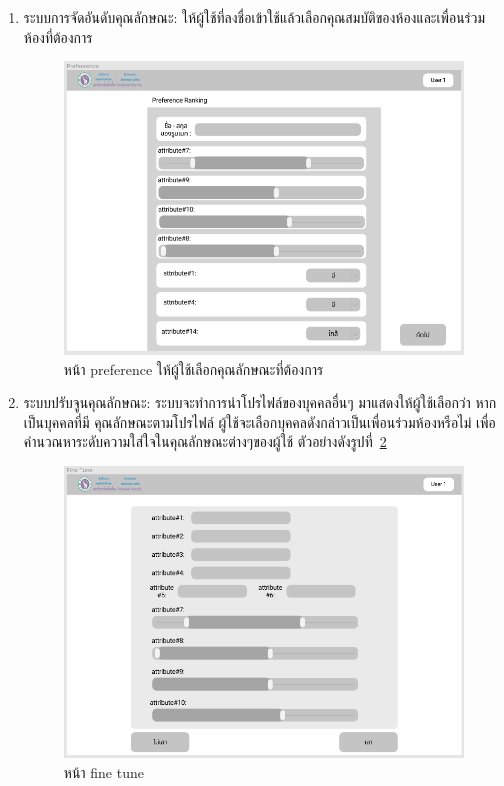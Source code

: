 \begin{enumerate}
  \clearpage
  \item ระบบการจัดอันดับคุณลักษณะ: ให้ผู้ใช้ที่ลงชื่อเข้าใช้แล้วเลือกคุณสมบัติของห้องและเพื่อนร่วมห้องที่ต้องการ
  \begin{figure}[h]
  \begin{center}
  \includegraphics[width=\linewidth]{photo/Preference.png}
  \end{center}
  \caption{หน้า preference ให้ผู้ใช้เลือกคุณลักษณะที่ต้องการ}
  \label{fig:preference}
  \end{figure}
  
  \clearpage
  \item ระบบปรับจูนคุณลักษณะ: ระบบจะทำการนำโปรไฟล์ของบุคคลอื่นๆ มาแสดงให้ผู้ใช้เลือกว่า หากเป็นบุคคลที่มี
  คุณลักษณะตามโปรไฟล์ ผู้ใช้จะเลือกบุคคลดังกล่าวเป็นเพื่อนร่วมห้องหรือไม่ เพื่อคำนวณหาระดับความใส่ใจในคุณลักษณะต่างๆของผู้ใช้ 
  ตัวอย่างดังรูปที่~\ref{fig:finetune}
  \begin{figure}[h]
  \begin{center}
  \includegraphics[width=\linewidth]{photo/finetune.png}
  \end{center}
  \caption{หน้า fine tune}
  \label{fig:finetune}
  \end{figure}


\end{enumerate}

